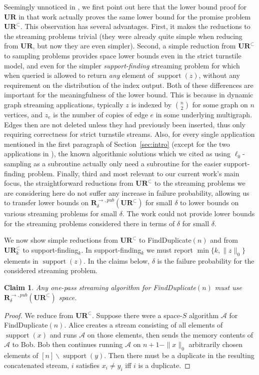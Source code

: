\documentclass[11pt]{article}
\newcommand{\supp}{\mathop{support}}
\newcommand{\suppfind}[1]{support-finding$_{{#1}}$}
\newtheorem{claim}{Claim}
\newcommand{\ur}{\mathbf{UR}\xspace}
\newcommand{\randcom}{\mathbf{R}}
\newcommand{\findup}[1]{\textsf{FindDuplicate}$({#1})$\xspace}
\begin{document}
Seemingly unnoticed in \cite{JowhariST11}, we first point out here that the lower bound proof for $\ur$ in that work actually proves the same lower bound for the promise problem $\ur^\subset$. This observation has several advantages. First, it makes the reductions to the streaming problems trivial (they were already quite simple when reducing from $\ur$, but now they are even simpler). Second, a simple reduction from $\ur^\subset$ to sampling problems provides space lower bounds even in the strict turnstile model, and even for the simpler {\em \suppfind{}} streaming problem for which when queried is allowed to return {\em any} element of $\supp(z)$, without any requirement on the distribution of the index output. Both of these differences are important for the meaningfulness of the lower bound. This is because in dynamic graph streaming applications, typically $z$ is indexed by $\binom{n}{2}$ for some graph on $n$ vertices, and $z_e$ is the number of copies of edge $e$ in some underlying multigraph. Edges then are not deleted unless they had previously been inserted, thus only requiring correctness for strict turnstile streams. Also, for every single application mentioned in the first paragraph of Section~\ref{sec:intro} (except for the two applications in \cite{FrahlingIS08}), the known algorithmic solutions which we cited as using $\ell_0$-sampling as a subroutine actually only need a subroutine for the easier \suppfind{} problem. Finally, third and most relevant to our current work's main focus, the straightforward reductions from $\ur^\subset$ to the streaming problems we are considering here do not suffer any increase in failure probability, allowing us to transfer lower bounds on $\randcom^{\rightarrow,pub}_{\delta}(\ur^\subset)$ for small $\delta$ to lower bounds on various streaming problems for small $\delta$. The work \cite{JowhariST11} could not provide lower bounds for the streaming problems considered there in terms of $\delta$ for small $\delta$.

We now show simple reductions from $\ur^\subset$ to \findup{n} and from $\ur_k^\subset$ to \suppfind{k}. In \suppfind{k} we must report $\min\{k,\|z\|_0\}$ elements in $\supp(z)$. In the claims below, $\delta$ is the failure probability for the considered streaming problem.

\begin{claim}
Any one-pass streaming algorithm for \findup{n} must use $\randcom^{\rightarrow,pub}_{\delta}(\ur^\subset)$ space.
\end{claim}
\begin{proof}
  We reduce from $\ur^\subset$. Suppose there were a space-$S$ algorithm $\mathcal{A}$ for \findup{n}. Alice creates a stream consisting of all elements of $\supp(x)$ and runs $\mathcal{A}$ on those elements, then sends the memory contents of $\mathcal{A}$ to Bob. Bob then continues running $\mathcal{A}$ on $n+1-\|x\|_0$ arbitrarily chosen elements of $[n]\backslash\supp(y)$. Then there must be a duplicate in the resulting concatenated stream, $i$ satisfies $x_i\neq y_i$ iff $i$ is a duplicate.
\end{proof}
\end{document}
